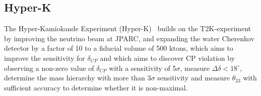 \subsection{Hyper-K}

The Hyper-Kamiokande Experiment (Hyper-K)~\cite{24HyperK}  builds on the T2K-experiment~\cite{21T2K} by improving the neutrino beam at JPARC, and expanding the water Cherenkov detector by a factor of 10 to a fiducial volume of 500 ktons, which aims to improve the sensitivity for $\delta_{CP}$ and which aims to discover CP violation by observing a non-zero value of $\delta_{CP}$ with a sensitivity of 5$\sigma$, measure $\Delta \delta < 18^\circ$, determine the mass hierarchy with more than 3$\sigma$ sensitivity and measure $\theta_{23}$ with sufficient accuracy to determine whether it is non-maximal.


